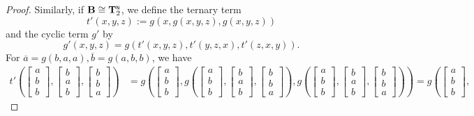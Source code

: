 \documentclass[11pt]{amsart}
\newcommand{\m}[1]{\mathbf{\uppercase{#1}}}
\newcommand{\n}{\scriptscriptstyle{\mathsf{N}}}
\theoremstyle{definition}
\theoremstyle{remark}
\theoremstyle{plain}
\def\T{\mathbf{T}}
\begin{document}
\begin{proof}
Similarly, if $\m b\cong {\T}_2^{\n}$, we define the ternary term $$t'(x,y,z):=g(x,g(x,y,z),g(x,y,z))$$ and the cyclic term $g'$ by
$$g'(x,y,z)=g(t'(x,y,z),t'(y,z,x),t'(z,x,y)).$$
For $\overline{a}=g(b,a,a), \overline{b}=g(a,b,b)$, we have
\begin{align*}
t'\left(
\begin{bmatrix}
a \\
b \\
b
\end{bmatrix}\!,\!
\begin{bmatrix}
b \\
a \\
b
\end{bmatrix}\!,\!
\begin{bmatrix}
b \\
b \\
a
\end{bmatrix}
\right)& =g\left(
\begin{bmatrix}
a \\
b \\
b
\end{bmatrix}\!,
g\left(
\begin{bmatrix}
a \\
b \\
b
\end{bmatrix}\!,\! 
\begin{bmatrix}
b \\
a \\
b
\end{bmatrix}\!,\!
\begin{bmatrix}
b \\
b \\
a
\end{bmatrix}
\right)\!,
g\left(
\begin{bmatrix}
a \\
b \\
b
\end{bmatrix}\!,\! 
\begin{bmatrix}
b \\
a \\
b
\end{bmatrix}\!,\!
\begin{bmatrix}
b \\
b \\
a
\end{bmatrix}\!
\right)
\right)=g\left(
\begin{bmatrix}
a \\
b \\
b
\end{bmatrix}\!,\! 

\end{align*}
\end{proof}
\end{document}
